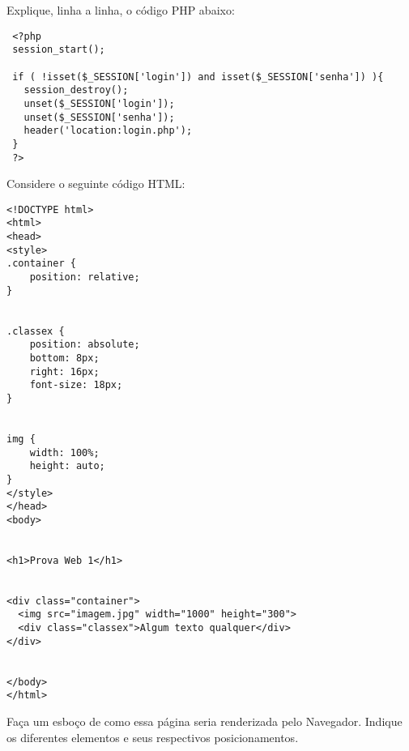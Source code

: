 \documentclass[a4paper, 12pt, addpoints]{cls/exam}
\begin{document}
\begin{questions}
\question[2] Explique, linha a linha, o código PHP abaixo:

\lstset{
	numbers=left,
	language=PHP,
	frame=single,
	breaklines=true,
	basicstyle=\footnotesize
}

\begin{lstlisting}
 <?php
 session_start();

 if ( !isset($_SESSION['login']) and isset($_SESSION['senha']) ){
   session_destroy();
   unset($_SESSION['login']);
   unset($_SESSION['senha']);
   header('location:login.php');
 }
 ?>
\end{lstlisting}

\question[2] Considere o seguinte código HTML: 

\lstset{
	language=HTML
}


\begin{lstlisting}
<!DOCTYPE html>
<html>
<head>
<style>
.container {
    position: relative;
}


.classex {
    position: absolute;
    bottom: 8px;
    right: 16px;
    font-size: 18px;
}


img { 
    width: 100%;
    height: auto;
}
</style>
</head>
<body>


<h1>Prova Web 1</h1>


<div class="container">
  <img src="imagem.jpg" width="1000" height="300">
  <div class="classex">Algum texto qualquer</div>
</div>


</body>
</html>
\end{lstlisting}

Faça um esboço de como essa página seria renderizada pelo Navegador. Indique os diferentes elementos e seus respectivos posicionamentos.

\end{questions}
\end{document}
